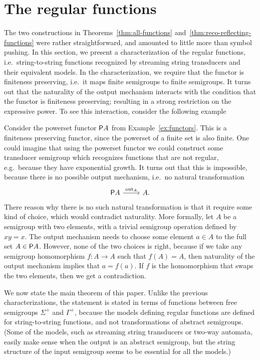 

\section{The regular functions}
\label{sec:reg-char}
The two constructions in Theorems~\ref{thm:all-functions} and~\ref{thm:reco-reflecting-functions} were rather straightforward, and amounted to little more than symbol pushing. In this section, we present a characterization of the regular functions, i.e.~string-to-string functions recognized by streaming string transducers and their equivalent models. In the characterization, we require that the functor is finiteness preserving, i.e.~it maps finite semigroups to finite semigroups. It turns out that the naturality of the output mechanism interacts with the condition that 
the functor is finiteness preserving; resulting in a strong restriction on the expressive power. To see this interaction, consider the following example

\begin{myexample}
    Consider the powerset functor $\mathsf P A$ from Example~\ref{ex:functors}. This is a finiteness preserving functor, since the powerset of a finite set is also finite. One could imagine that using the powerset functor we could construct some transducer semigroup which recognizes functions that are not regular, e.g.~because they have exponential growth. It turns out that this is impossible, because there is no possible output mechanism, i.e.~no natural transformation 
    \[
    \begin{tikzcd}
    \powerset A 
    \ar[r,"\outfun_A"]
    &
    A.
    \end{tikzcd}
    \]
    There reason why there is no such natural transformation is that it require some kind of choice, which would contradict naturality. More formally, let $A$ be a semigroup with two elements, with a trivial semigroup operation defined by $xy=x$. The output mechanism needs to choose some element $a \in A$ to the full set $A \in \mathsf P A$. However, none of the two choices is right, because if we take any semigroup homomorphism $f : A \to A$ such that $f(A)=A$, then  naturality of the output mechanism implies that $a=f(a)$. If $f$ is the homomorphism that swaps the two elements, then we get a contradiction.
\end{myexample}


We now state the main theorem of this paper. Unlike the previous characterizations, the statement is stated in terms of functions between free semigroups $\Sigma^+$ and $\Gamma^+$, because the models defining regular functions are defined for string-to-string functions, and not transformations of abstract semigroups. (Some of the models, such as streaming string transducers or two-way automata, easily make sense when the output is an abstract semigroup, but the string structure of the input semigroup seems to be essential for all the models.) 

